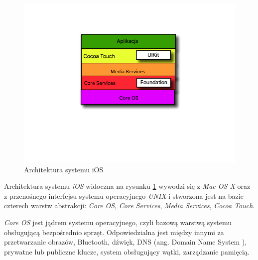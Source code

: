 \documentclass{iiuwb}
\begin{document}
\begin{figure}[!th]
\centering
\includegraphics[scale=.5]{image/ArchitekturaiOS.jpg}
\caption{Architektura systemu iOS}
\label{fig:Architektura iOS}
\end{figure}
Architektura systemu \textit{iOS}  widoczna na rysunku \ref{fig:Architektura iOS} wywodzi się z \textit{Mac OS X}  oraz z przenośnego interfejsu systemu operacyjnego \textit{UNIX} i stworzona jest na bazie czterech warstw abstrakcji: \textit{Core OS}, \textit{Core Services}, \textit{Media Services}, \textit{Cocoa Touch}.

\textit{Core OS} jest jądrem systemu operacyjnego, czyli bazową warstwą systemu obsługującą bezpośrednio sprzęt. Odpowiedzialna jest między innymi za przetwarzanie obrazów, Bluetooth, dźwięk, DNS (ang. Domain Name System ), prywatne lub publiczne klucze, system obsługujący wątki, zarządzanie pamięcią.
\end{document}
